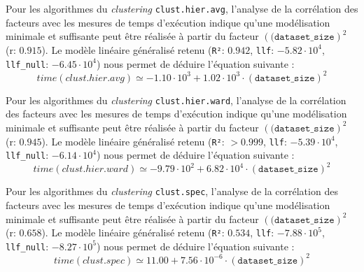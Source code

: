 			Pour les algorithmes du \textit{clustering} \texttt{clust.hier.avg}, l'analyse de la corrélation des facteurs avec les mesures de temps d'exécution indique qu'une modélisation minimale et suffisante peut être réalisée à partir du facteur $(\texttt{(dataset\_size})^{2}$ (r: $0.915$).
			Le modèle linéaire généralisé retenu (\texttt{R²}: $0.942$, \texttt{llf}: $-5.82\cdot10^{4}$, \texttt{llf\_null}: $-6.45\cdot10^{4}$) nous permet de déduire l'équation suivante :
			\begin{equation}
				time(clust.hier.avg)
				\simeq -1.10\cdot10^{3} + 1.02\cdot10^{3}\cdot(\texttt{dataset\_size})^{2}
			\end{equation}

			Pour les algorithmes du \textit{clustering} \texttt{clust.hier.ward}, l'analyse de la corrélation des facteurs avec les mesures de temps d'exécution indique qu'une modélisation minimale et suffisante peut être réalisée à partir du facteur $(\texttt{(dataset\_size})^{2}$ (r: $0.945$).
			Le modèle linéaire généralisé retenu (\texttt{R²}: $> 0.999$, \texttt{llf}: $-5.39\cdot10^{4}$, \texttt{llf\_null}: $-6.14\cdot10^{4}$) nous permet de déduire l'équation suivante :
			\begin{equation}
				time(clust.hier.ward)
				\simeq -9.79\cdot10^{2} + 6.82\cdot10^{4}\cdot(\texttt{dataset\_size})^{2}
			\end{equation}
			
			Pour les algorithmes du \textit{clustering} \texttt{clust.spec}, l'analyse de la corrélation des facteurs avec les mesures de temps d'exécution indique qu'une modélisation minimale et suffisante peut être réalisée à partir du facteur $(\texttt{(dataset\_size})^{2}$ (r: $0.658$).
			Le modèle linéaire généralisé retenu (\texttt{R²}: $0.534$, \texttt{llf}: $-7.88\cdot10^{5}$, \texttt{llf\_null}: $-8.27\cdot10^{5}$) nous permet de déduire l'équation suivante :
			\begin{equation}
				time(clust.spec)
				\simeq 11.00 + 7.56\cdot10^{-6}\cdot(\texttt{dataset\_size})^{2}
			\end{equation}
			
